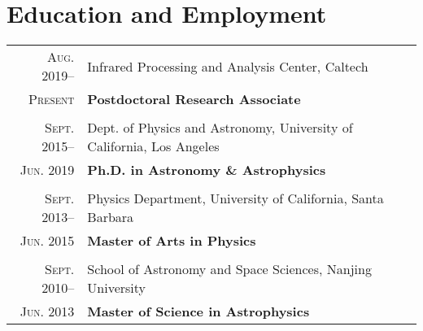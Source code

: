 \documentclass[letterpaper,12pt]{article}
\newcommand{\narrow}{-1.6ex}
\begin{document}
\section{Education and Employment}
\vspace*{.8ex}
\begin{tabular}{r|p{5.25in}}
    \textsc{Aug. 2019}--      &   Infrared Processing and Analysis Center, Caltech \\
    \textsc{Present}          &   \hfill\textbf{Postdoctoral Research Associate}    \\
    \multicolumn{2}{c}{} \\[\narrow]
    \textsc{Sept. 2015}--     &   Dept. of Physics and Astronomy, University of California, Los Angeles \\
    \textsc{Jun. 2019}        &   \hfill\textbf{Ph.D. in Astronomy \& Astrophysics} \\
    \multicolumn{2}{c}{} \\[\narrow]
    \textsc{Sept. 2013}--     &   Physics Department, University of California, Santa Barbara     \\
    \textsc{Jun. 2015}        &   \hfill\textbf{Master of Arts in Physics}      \\
    \multicolumn{2}{c}{} \\[\narrow]
    \textsc{Sept. 2010}--     &   School of Astronomy and Space Sciences, Nanjing University      \\
    \textsc{Jun. 2013}        &   \hfill\textbf{Master of Science in Astrophysics}      \\

\end{tabular}
\end{document}
